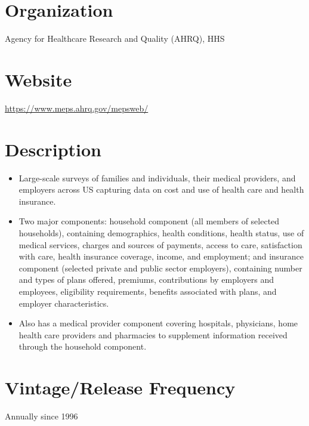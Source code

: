 \documentclass[
]{book}
\providecommand{\tightlist}{%
  \setlength{\itemsep}{0pt}\setlength{\parskip}{0pt}}
\begin{document}
\hypertarget{organization-36}{%
\section{Organization}\label{organization-36}}

Agency for Healthcare Research and Quality (AHRQ), HHS

\hypertarget{website-36}{%
\section{Website}\label{website-36}}

\url{https://www.meps.ahrq.gov/mepsweb/}

\hypertarget{description-36}{%
\section{Description}\label{description-36}}

\begin{itemize}
\tightlist
\item
  Large-scale surveys of families and individuals, their medical providers, and employers across US capturing data on cost and use of health care and health insurance.\\
\item
  Two major components: household component (all members of selected households), containing demographics, health conditions, health status, use of medical services, charges and sources of payments, access to care, satisfaction with care, health insurance coverage, income, and employment; and insurance component (selected private and public sector employers), containing number and types of plans offered, premiums, contributions by employers and employees, eligibility requirements, benefits associated with plans, and employer characteristics.\\
\item
  Also has a medical provider component covering hospitals, physicians, home health care providers and pharmacies to supplement information received through the household component.
\end{itemize}

\hypertarget{vintagerelease-frequency-36}{%
\section{Vintage/Release Frequency}\label{vintagerelease-frequency-36}}

Annually since 1996
\end{document}
